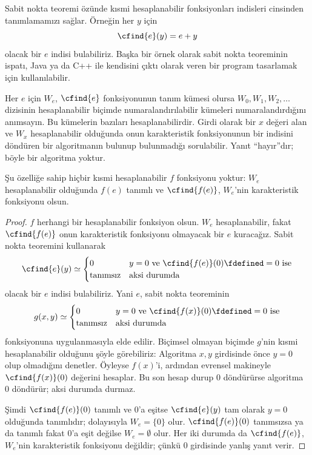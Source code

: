 \documentclass[../../../include/open-logic-section]{subfiles}
\begin{document}

Sabit nokta teoremi özünde kısmi hesaplanabilir fonksiyonları indisleri
cinsinden tanımlamamızı sağlar. Örneğin her $y$ için
\[
  \cfind{e}(y)=e+y
\]
olacak bir $e$ indisi bulabiliriz. Başka bir örnek olarak sabit nokta
teoreminin ispatı, Java ya da C++ ile kendisini çıktı olarak veren bir program
tasarlamak için kullanılabilir.

Her $e$ için $W_e$, $\cfind{e}$ fonksiyonunun tanım kümesi olursa
$W_0,W_1,W_2,\dots$ dizisinin hesaplanabilir biçimde numaralandırılabilir
kümeleri numaralandırdığını anımsayın. Bu kümelerin bazıları
hesaplanabilirdir. Girdi olarak bir $x$ değeri alan ve $W_x$ hesaplanabilir
olduğunda onun karakteristik fonksiyonunun bir indisini döndüren bir
algoritmanın bulunup bulunmadığı sorulabilir. Yanıt ``hayır''dır; böyle bir
algoritma yoktur.

\begin{thm}
Şu özelliğe sahip hiçbir kısmi hesaplanabilir $f$ fonksiyonu yoktur:
$W_e$ hesaplanabilir olduğunda $f(e)$ tanımlı ve $\cfind{f(e)}$, $W_e$'nin
karakteristik fonksiyonu olsun.
\end{thm}

\begin{proof}
$f$ herhangi bir hesaplanabilir fonksiyon olsun. $W_e$ hesaplanabilir,
fakat $\cfind{f(e)}$ onun karakteristik fonksiyonu olmayacak bir $e$
kuracağız. Sabit nokta teoremini kullanarak
\[
  \cfind{e}(y)\simeq\begin{cases}
    0 & \text{$y=0$ ve $\cfind{f(e)}(0)\fdefined=0$ ise}\\
    \text{tanımsız} & \text{aksi durumda}
  \end{cases}
\]
olacak bir $e$ indisi bulabiliriz. Yani $e$, sabit nokta teoreminin
\[
  g(x,y)\simeq\begin{cases}
    0 & \text{$y=0$ ve $\cfind{f(x)}(0)\fdefined=0$ ise}\\
    \text{tanımsız} & \text{aksi durumda}
  \end{cases}
\]
fonksiyonuna uygulanmasıyla elde edilir.
Biçimsel olmayan biçimde $g$'nin kısmi hesaplanabilir olduğunu şöyle
görebiliriz: Algoritma $x,y$ girdisinde önce $y=0$ olup olmadığını denetler.
Öyleyse $f(x)$'i, ardından evrensel makineyle $\cfind{f(x)}(0)$ değerini
hesaplar. Bu son hesap durup $0$ döndürürse algoritma $0$ döndürür; aksi
durumda durmaz.

Şimdi $\cfind{f(e)}(0)$ tanımlı ve $0$'a eşitse $\cfind{e}(y)$ tam olarak
$y=0$ olduğunda tanımlıdır; dolayısıyla $W_e=\{0\}$ olur.
$\cfind{f(e)}(0)$ tanımsızsa ya da tanımlı fakat $0$'a eşit değilse
$W_e=\emptyset$ olur. Her iki durumda da $\cfind{f(e)}$, $W_e$'nin
karakteristik fonksiyonu değildir; çünkü $0$ girdisinde yanlış yanıt verir.
\end{proof}
\end{document}
